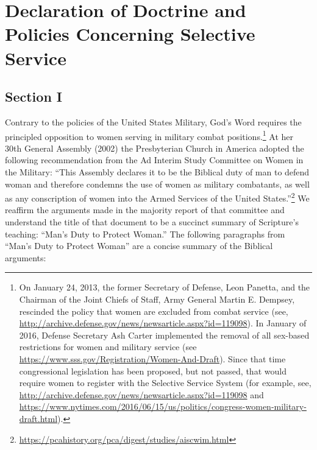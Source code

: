 \documentclass[
]{book}
\begin{document}
\begin{quote}
\begin{enumerate}
\end{enumerate}
\end{quote}

\hypertarget{declaration-of-doctrine-and-policies-concerning-selective-service}{%
\chapter{Declaration of Doctrine and Policies Concerning Selective Service}\label{declaration-of-doctrine-and-policies-concerning-selective-service}}

\hypertarget{section-i}{%
\section*{Section I}\label{section-i}}

Contrary to the policies of the United States Military, God's Word requires the principled opposition to women serving in military combat positions.\footnote{On January 24, 2013, the former Secretary of Defense, Leon Panetta, and the Chairman of the Joint Chiefs of Staff, Army General Martin E. Dempsey, rescinded the policy that women are excluded from combat service (see, \url{http://archive.defense.gov/news/newsarticle.aspx?id=119098}). In January of 2016, Defense Secretary Ash Carter implemented the removal of all sex-based restrictions for women and military service (see \url{https://www.sss.gov/Registration/Women-And-Draft}). Since that time congressional legislation has been proposed, but not passed, that would require women to register with the Selective Service System (for example, see, \url{http://archive.defense.gov/news/newsarticle.aspx?id=119098} and \url{https://www.nytimes.com/2016/06/15/us/politics/congress-women-military-draft.html}).} At her 30th General Assembly (2002) the Presbyterian Church in America adopted the following recommendation from the Ad Interim Study Committee on Women in the Military: ``This Assembly declares it to be the Biblical duty of man to defend woman and therefore condemns the use of women as military combatants, as well as any conscription of women into the Armed Services of the United States.''\footnote{\url{https://pcahistory.org/pca/digest/studies/aiscwim.html}} We reaffirm the arguments made in the majority report of that committee and understand the title of that document to be a succinct summary of Scripture's teaching: ``Man's Duty to Protect Woman.'' The following paragraphs from ``Man's Duty to Protect Woman'' are a concise summary of the Biblical arguments:
\end{document}
